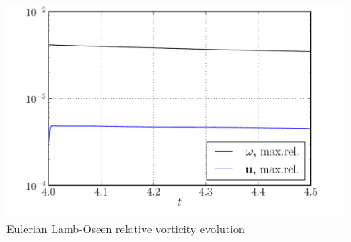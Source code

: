 	\begin{figure}[t]
	\centering
	\includegraphics[width=0.7\linewidth]{./figures/eulerian/lambOseen_eulerian_wRelEvolution_compressed.pdf}
	\caption{Eulerian Lamb-Oseen relative vorticity evolution}
	\label{fig:lambOseen_eulerian_wRelEvolution}
	\end{figure}

